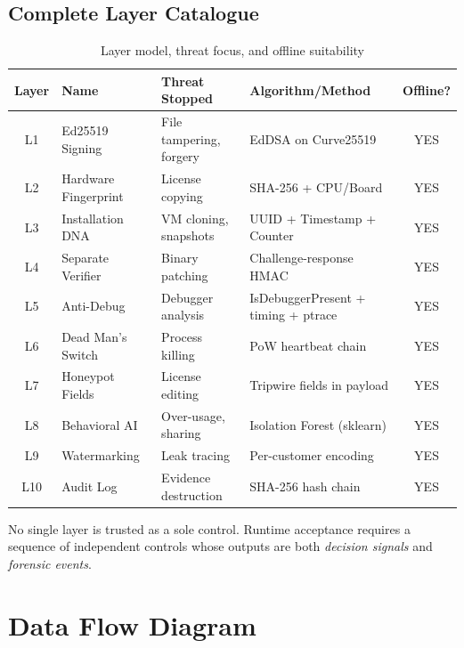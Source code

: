 \documentclass[11pt,a4paper]{article}
\begin{document}
\subsection{Complete Layer Catalogue}
\begin{table}[H]
\centering
\caption{Layer model, threat focus, and offline suitability}
\small
\begin{tabularx}{\textwidth}{c l Y Y c}
\toprule
\textbf{Layer} & \textbf{Name} & \textbf{Threat Stopped} & \textbf{Algorithm/Method} & \textbf{Offline?} \\
\midrule
L1 & Ed25519 Signing & File tampering, forgery & EdDSA on Curve25519 & YES \\
L2 & Hardware Fingerprint & License copying & SHA-256 + CPU/Board & YES \\
L3 & Installation DNA & VM cloning, snapshots & UUID + Timestamp + Counter & YES \\
L4 & Separate Verifier & Binary patching & Challenge-response HMAC & YES \\
L5 & Anti-Debug & Debugger analysis & IsDebuggerPresent + timing + ptrace & YES \\
L6 & Dead Man's Switch & Process killing & PoW heartbeat chain & YES \\
L7 & Honeypot Fields & License editing & Tripwire fields in payload & YES \\
L8 & Behavioral AI & Over-usage, sharing & Isolation Forest (sklearn) & YES \\
L9 & Watermarking & Leak tracing & Per-customer encoding & YES \\
L10 & Audit Log & Evidence destruction & SHA-256 hash chain & YES \\
\bottomrule
\end{tabularx}
\end{table}

\begin{tcolorbox}[certicallout,title=\textbf{Design Principle}]
No single layer is trusted as a sole control. Runtime acceptance requires a sequence of independent controls whose outputs are both \emph{decision signals} and \emph{forensic events}.
\end{tcolorbox}

\section{Data Flow Diagram}
\end{document}
